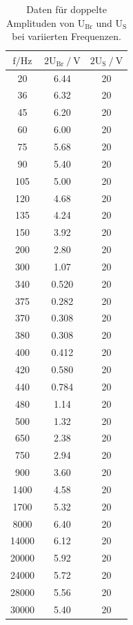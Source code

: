 \begin{table}
\centering
\begin{tabular}{c c c}
\toprule
{$\text{f} \mathbin{/} \si{\hertz}$} &{$ 2\text{U}_\text{Br} \mathbin{/} \si{\volt} $} & {$ 2 \text{U}_\text{S} \mathbin{/} \si{\volt} $} \\
\midrule
20    & 6.44  & 20\\
36    & 6.32  & 20\\
45    & 6.20  & 20\\
60   &  6.00  & 20\\
75   &  5.68  & 20\\
90   &  5.40  & 20\\
105  &  5.00  & 20\\
120  &  4.68  & 20\\
135  &  4.24  & 20\\
150  &  3.92  & 20\\
200  &  2.80  & 20\\
300  &  1.07  & 20\\
340  &  0.520 & 20\\
375  &  0.282 & 20\\
370  &  0.308 & 20\\
380  &  0.308 & 20\\
400  &  0.412 & 20\\
420  &  0.580 & 20\\
440  &  0.784 & 20\\
480  &  1.14  & 20\\
500  &  1.32  & 20\\
650  &  2.38  & 20\\
750  &  2.94  & 20\\
900  &  3.60  & 20\\
1400 &  4.58  & 20\\
1700 &  5.32  & 20\\
8000 &  6.40  & 20\\
14000&  6.12  & 20\\
20000&  5.92  & 20\\
24000&  5.72  & 20\\
28000&  5.56  & 20\\
30000&  5.40  & 20\\
\bottomrule
\end{tabular}
\caption{Daten für doppelte Amplituden von $\text{U}_\text{Br}$ und $\text{U}_\text{S}$ bei variierten Frequenzen.}
\label{tab:ae}
\end{table}